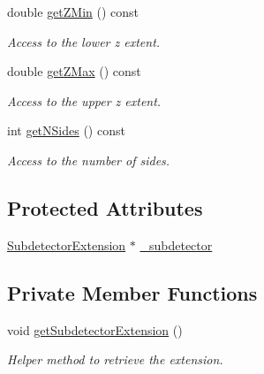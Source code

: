 \begin{DoxyCompactItemize}
double \hyperlink{class_d_d4hep_1_1_d_d_rec_1_1_subdetector_a19f31cd6e82a8150885f2b73477eb114}{getZMin} () const 
\begin{DoxyCompactList}\small\item\em Access to the lower z extent. \item\end{DoxyCompactList}\item 
double \hyperlink{class_d_d4hep_1_1_d_d_rec_1_1_subdetector_ac99969b1e8f25dc90a73a5d60c8bc065}{getZMax} () const 
\begin{DoxyCompactList}\small\item\em Access to the upper z extent. \item\end{DoxyCompactList}\item 
int \hyperlink{class_d_d4hep_1_1_d_d_rec_1_1_subdetector_ad35bc9e9e55f13b1f8dec7bc47941504}{getNSides} () const 
\begin{DoxyCompactList}\small\item\em Access to the number of sides. \item\end{DoxyCompactList}\end{DoxyCompactItemize}
\subsection*{Protected Attributes}
\begin{DoxyCompactItemize}
\item 
\hyperlink{class_d_d4hep_1_1_d_d_rec_1_1_subdetector_extension}{SubdetectorExtension} $\ast$ \hyperlink{class_d_d4hep_1_1_d_d_rec_1_1_subdetector_a5caedab984b0c8d6810eae5b85d238b1}{\_\-subdetector}
\end{DoxyCompactItemize}
\subsection*{Private Member Functions}
\begin{DoxyCompactItemize}
\item 
void \hyperlink{class_d_d4hep_1_1_d_d_rec_1_1_subdetector_a40f367c23928392476ad5c3f98da8a1a}{getSubdetectorExtension} ()
\begin{DoxyCompactList}\small\item\em Helper method to retrieve the extension. \item\end{DoxyCompactList}\end{DoxyCompactItemize}


